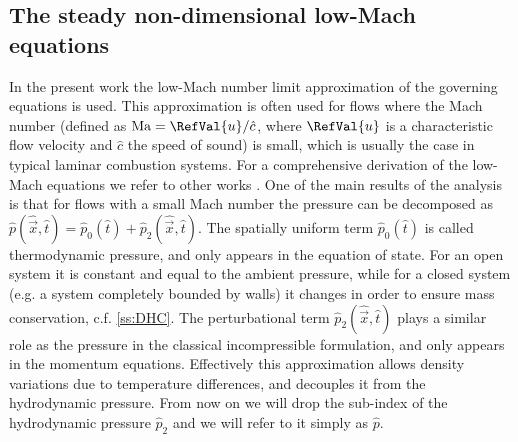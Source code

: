 \subsection{The steady non-dimensional low-Mach equations} \label{ssec:NonDimLowMachEquations}
In the present work the low-Mach number limit approximation of the governing equations is used. This approximation is often used for flows where the Mach number (defined as $\text{Ma} = \RefVal{u}/\hat c$, where $\RefVal{u}$ is a characteristic flow velocity and $\hat{c}$ the speed of sound) is small, which is usually the case in typical laminar combustion systems. \cite{dobbinsFullyImplicitCompact2010} For a comprehensive derivation of the low-Mach equations we refer to other works\cite{majdaDerivationNumericalSolution1985} \cite{rauwoensConservativeDiscreteCompatibilityconstraint2009} \cite{mullerLowMachNumberAsymptoticsNavierStokes1998} \cite{kleinNumericalModellingHigh2002}.  
One of the main results of the analysis is that for flows with a small Mach number the pressure can be decomposed as $\hat p(\hat {\vec{x}}, \hat t) = \hat p_0(\hat t) + \hat p_2(\hat{\vec{x}},\hat t)$. The spatially uniform  term $\hat p_0(\hat t)$ is called thermodynamic pressure, and only appears in the equation of state. For an open system it is constant and equal to the ambient pressure, while for a closed system (e.g. a system completely bounded by walls) it changes in order to ensure mass conservation, c.f. \cref{ss:DHC}. The perturbational term  $\hat p_2(\hat{\vec{x}},\hat t)$  plays a similar role as the pressure in the classical incompressible formulation, and only appears in the momentum equations. Effectively this approximation allows density variations due to temperature differences, and decouples it from the hydrodynamic pressure. From now on we will drop the sub-index of the hydrodynamic pressure $\hat p_2$ and we will refer to it simply as $\hat p$.

